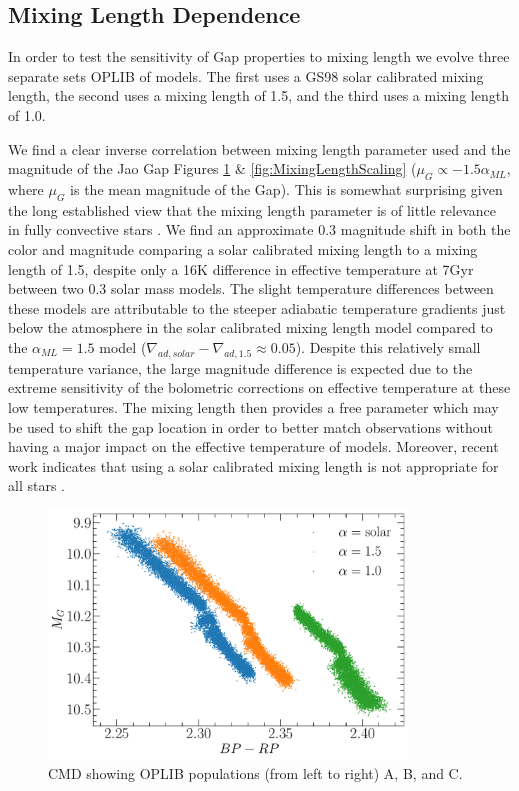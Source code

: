 \subsection{Mixing Length Dependence}
In order to test the sensitivity of Gap properties to mixing length we
evolve three separate sets OPLIB of models. The first uses a GS98
solar calibrated mixing length, the second uses a mixing length of
1.5, and the third uses a mixing length of 1.0.

We find a clear inverse correlation between mixing length parameter used and
the magnitude of the Jao Gap Figures \ref{fig:MixingLengthCMD} \&
\ref{fig:MixingLengthScaling} ($\mu_{G} \propto -1.5\alpha_{ML}$, where
$\mu_{G}$ is the mean magnitude of the Gap). This is somewhat surprising given
the long established view that the mixing length parameter is of little
relevance in fully convective stars \citep{Baraffe1997}. We find an approximate
0.3 magnitude shift in both the color and magnitude comparing a solar
calibrated mixing length to a mixing length of 1.5, despite only a 16K
difference in effective temperature at 7Gyr between two 0.3 solar mass models.
The slight temperature differences between these models are
attributable to the steeper adiabatic temperature gradients just below the
atmosphere in the solar calibrated mixing length model compared to the
$\alpha_{ML} = 1.5$ model ($\nabla_{ad,solar} - \nabla_{ad,1.5} \approx 0.05$).
Despite this relatively small temperature variance, the large magnitude
difference is expected due to the extreme sensitivity of the bolometric
corrections on effective temperature at these low temperatures. The
mixing length then provides a free parameter which may be used to shift the gap
location in order to better match observations without having a major impact on
the effective temperature of models. Moreover, recent work indicates that using
a solar calibrated mixing length is not appropriate for all stars
\citep[e.g.][]{Trampedach2014, Joyce2018}.

\begin{figure}
	\centering
	\includegraphics[width=0.85\textwidth]{figures/jaoOpacity/./alphaMLComparisionCMD.pdf}
	\caption{CMD showing OPLIB populations (from left to right) A, B, and C.}
	\label{fig:MixingLengthCMD}
\end{figure}

